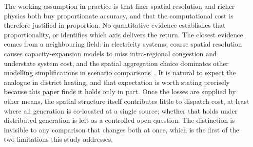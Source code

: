 The working assumption in practice is that finer spatial resolution and richer physics
both buy proportionate accuracy, and that the computational cost is therefore justified in
proportion. No quantitative evidence establishes that proportionality, or identifies which
axis delivers the return. The closest evidence comes from a neighbouring field: in
electricity systems, coarse spatial resolution causes capacity-expansion models to miss
intra-regional congestion and understate system cost, and the spatial aggregation choice
dominates other modelling simplifications in scenario
comparisons~\cite{Frysztacki2021}. It is natural to expect the analogue in district
heating, and that expectation is worth stating precisely because this paper finds it
holds only in part. Once the losses are supplied by other means, the spatial structure itself
contributes little to dispatch cost, at least where all generation is co-located at a
single source; whether that holds under distributed generation is left as a
controlled open question. The distinction is
invisible to any comparison that changes both at once, which is the first of the two
limitations this study addresses.
